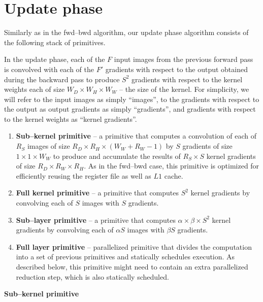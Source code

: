 \section{Update phase}

  Similarly as in the fwd--bwd algorithm, our update phase algorithm
  consists of the following stack of primitives.

  In the update phase, each of the $F$ input images from the previous
  forward pass is convolved with each of the $F'$ gradients with
  respect to the output obtained during the backward pass to produce
  $S^2$ gradients with respect to the kernel weights each of size $W_D
  \times W_H \times W_W$ -- the size of the kernel.  For simplicity,
  we will refer to the input images as simply ``images'', to the
  gradients with respect to the output as output gradients as simply
  ``gradients'', and gradients with respect to the kernel weights as
  ``kernel gradients''.

  \begin{enumerate}
    \item {\bf Sub--kernel primitive} -- a primitive that computes a
      convolution of each of $R_S$ images of size $R_D \times R_H
      \times (W_W + R_W - 1)$ by $S$ gradients of size $1 \times 1
      \times W_W$ to produce and accumulate the results of $R_S \times
      S$ kernel gradients of size $R_D \times R_W \times R_H$.  As in
      the fwd--bwd case, this primitive is optimized for efficiently
      reusing the register file as well as $L1$ cache.
    \item {\bf Full kernel primitive} -- a primitive that computes
      $S^2$ kernel gradients by convolving each of $S$ images with $S$
      gradients.
    \item {\bf Sub--layer primitive} -- a primitive that computes
      $\alpha \times \beta \times S^2$ kernel gradients by convolving
      each of $\alpha S$ images with $\beta S$ gradients.
    \item {\bf Full layer primitive} -- parallelized primitive that
      divides the computation into a set of previous primitives and
      statically schedules execution.  As described below, this
      primitive might need to contain an extra parallelized reduction
      step, which is also statically scheduled.
  \end{enumerate}


  {\bf Sub--kernel primitive} \quad













